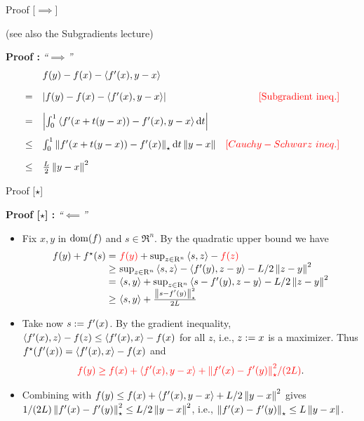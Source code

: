 \documentclass[9pt]{beamer}
\begin{document}
\begin{frame}{Proof [$\implies$]}

  (see also the Subgradients lecture)
  
  \textbf{Proof : }
  \emph{``$\implies$''}
  \[
    \begin{array}{rlr}
      & f(y)-f(x)-\left<f'(x), y-x\right> & \\[1em]
      = & \left|f(y)-f(x)-\left<f'(x), y-x\right>\right| & {\color{red} [\rm{Subgradient~ineq.}]}\\[1em]
      = & \left|\int_{0}^1 \left<f'(x+t(y-x))-f'(x), y-x\right> {\mathrm{d}} t\right| & \\[1em]
      \leq & \int_0^1 \left\|f'(x+t(y-x))-f'(x)\right\|_\star {\mathrm{d}} t \left\|y-x\right\| & {\color{red} [Cauchy-Schwarz~ineq.]}\\[1em]
      \leq & \frac{L}{2} \left\|y-x\right\|^2 & 
    \end{array}
  \]


\end{frame}

\begin{frame}{Proof [$\star$]}
  
  \textbf{Proof [$\star$] : }
  \emph{``$\impliedby$''}

  \begin{itemize}
  \item
    Fix $x, y$ in $\operatorname{dom}(f)$ and $s\in \Re^n$. By the quadratic upper bound we have
    \[
      \begin{array}{r@{}l}
        f(y) + f^\star(s) = &~\red{f(y)} + \sup_{z\in \Re^n} \iprod{s}{z} - \red{f(z)} \\
        \geq &~\sup_{z\in \Re^n} \iprod{s}{z} - \iprod{f'(y)}{z-y} - \tfrac{L}{2} \norm{z-y}^2\\
        = &~\iprod{s}{y}+ \sup_{z\in \Re^n} \iprod{s-f'(y)}{z-y} - \tfrac{L}{2} \norm{z-y}^2\\
        \geq &~\iprod{s}{y} + \frac{\norm{s-f'(y)}^2_{\star}}{2L}
      \end{array}
    \]
  \item<2->
    Take now $s:= f'(x)$. By the gradient inequality, $\left<f'(x), z\right> - f(z)\leq \left<f'(x), x\right>-f(x)$ for all $z$, i.e., $z:= x$ is a maximizer. Thus $f^\star(f'(x))=\left<f'(x), x\right>-f(x)$ and
    \[
      {\color{red} f(y) \geq f(x) + \left<f'(x), y-x\right> + {\left\|f'(x)-f'(y)\right\|_\star^2}/{(2L)}}.
    \]
  \item<3->
    Combining with $f(y)\leq f(x) + \left<f'(x), y-x\right> + {L}/{2} \left\|y-x\right\|^2$ gives ${1}/{(2L)}\left\|f'(x)-f'(y)\right\|_\star^2\leq {L}/{2}\left\|y-x\right\|^2$, i.e., $\left\|f'(x)-f'(y)\right\|_\star\leq L\left\|y-x\right\|$.

  \end{itemize}
\end{frame}
\end{document}
